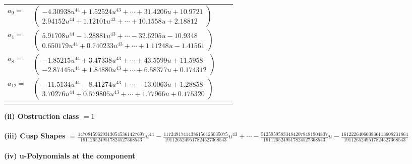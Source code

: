 \documentclass[1p]{elsarticle_modified}
\theoremstyle{definition}
\begin{document}
\begin{tabular}{m{7pt} m{180pt} m{7pt} m{180pt} }
\flushright $a_{9}=$&$\begin{pmatrix}-4.30938 u^{44}+1.52524 u^{43}+\cdots+31.4206 u+10.9721\\2.94152 u^{44}+1.12101 u^{43}+\cdots+10.1558 u+2.18812\end{pmatrix}$ \\
\flushright $a_{4}=$&$\begin{pmatrix}5.91708 u^{44}-1.28881 u^{43}+\cdots-32.6205 u-10.9348\\0.650179 u^{44}+0.740233 u^{43}+\cdots+1.11248 u-1.41561\end{pmatrix}$ \\
\flushright $a_{8}=$&$\begin{pmatrix}-1.85215 u^{44}+3.47338 u^{43}+\cdots+43.5599 u+11.5958\\-2.87445 u^{44}+1.84880 u^{43}+\cdots+6.58377 u+0.174312\end{pmatrix}$ \\
\flushright $a_{12}=$&$\begin{pmatrix}-11.5134 u^{44}-8.41274 u^{43}+\cdots-13.0063 u+1.28858\\3.70276 u^{44}+0.579805 u^{43}+\cdots+1.77966 u+0.175320\end{pmatrix}$\\&\end{tabular}
\flushleft \textbf{(ii) Obstruction class $= 1$}\\~\\
\flushleft \textbf{(iii) Cusp Shapes $= \frac{147081596293130545361427697}{1911265249517824527368543} u^{44}-\frac{11724917414386156126035075}{1911265249517824527368543} u^{43}+\cdots-\frac{512595958334842078481904837}{1911265249517824527368543} u-\frac{161222640603836113608231864}{1911265249517824527368543}$}\\~\\
\newpage\renewcommand{\arraystretch}{1}
\flushleft \textbf{(iv) u-Polynomials at the component}\newline \\
\end{document}
